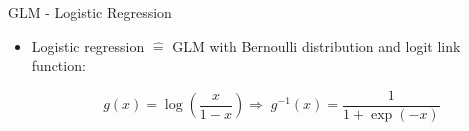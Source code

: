 \documentclass[10pt,compress,t,notes=noshow, xcolor=table]{beamer}
\begin{document}
\begin{frame}{GLM - Logistic Regression}

\begin{itemize}
    \item Logistic regression $\hat{=}$ GLM with Bernoulli distribution and logit link function: 


$$
g(x) = \log\left(\frac{x}{1 - x}\right)  
\Rightarrow \; g^{-1}(x) = \frac{1}{1+\exp(-x)}
$$






\end{itemize}
\end{frame}
\end{document}
